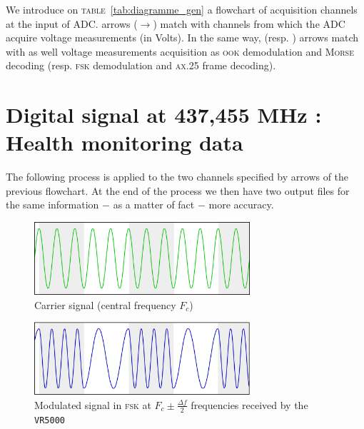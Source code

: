\documentclass[a4paper]{report}
\newenvironment{remark}[1][Remark.]{\begin{trivlist}
\item[\hskip \labelsep {\bfseries #1}]}{\end{trivlist}}
\begin{document}
\begin{remark}
  We introduce on \textsc{table}~\ref{tab:diagramme_gen} a flowchart of acquisition channels at the input of ADC. { \color{oneblue}{Blue} } arrows ($\rightarrow$) match with channels from which the ADC acquire voltage measurements (in Volts). In the same way, { \color{rltgreen}{green} } (resp. { \color{rltred}{red} }) arrows match with as well voltage measurements acquisition as \textsc{ook} demodulation and \textsc{Morse} decoding (resp. \textsc{fsk} demodulation and \textsc{ax.25} frame decoding).
\end{remark}

\section{Digital signal at 437,455 MHz : Health monitoring data}

The following process is applied to the two channels specified by { \color{rltred}{red} } arrows of the previous flowchart. At the end of the process we then have two output files for the same information $-$ as a matter of fact $-$ more accuracy.

\begin{figure}[h]
  \begin{center}
  \includegraphics[width=8cm]{pictures/porteuse.png}
  \end{center}
  \caption{Carrier signal (central frequency $F_c$)}
  \label{fig:signal_porteur}
\end{figure}

\begin{figure}[h]
  \begin{center}
  \includegraphics[width=8cm]{pictures/signal_mod.png}
  \end{center}
  \caption{Modulated signal in \textsc{fsk} at $F_c \pm \frac{\Delta f}{2}$ frequencies received by the \texttt{VR5000}}
  \label{fig:signal_module}
\end{figure}
\end{document}
